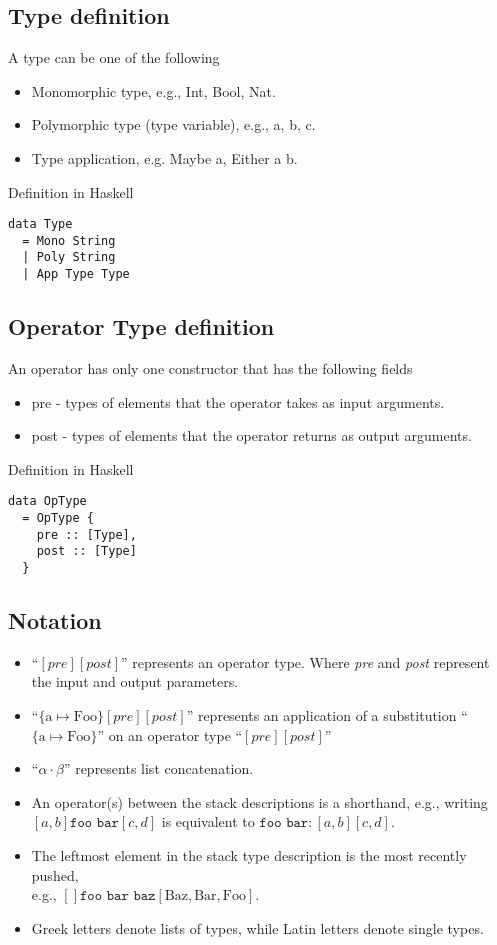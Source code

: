 \documentclass{article}
\newcommand{\op}[3]{[#1] \texttt{#2} [#3]}
\begin{document}
\subsection*{Type definition}
A type can be one of the following
\begin{itemize}
  \item Monomorphic type, e.g., Int, Bool, Nat.
  \item Polymorphic type (type variable), e.g., a, b, c.
  \item Type application, e.g. Maybe a, Either a b.
\end{itemize}
Definition in Haskell
\begin{verbatim}
data Type
  = Mono String
  | Poly String
  | App Type Type
\end{verbatim}

\subsection*{Operator Type definition}
An operator has only one constructor that has the following fields
\begin{itemize}
  \item pre - types of elements that the operator takes as input arguments.
  \item post - types of elements that the operator returns as output arguments.
\end{itemize}
Definition in Haskell
\begin{verbatim}
data OpType
  = OpType {
    pre :: [Type],
    post :: [Type]
  }
\end{verbatim}

\subsection*{Notation}
\begin{itemize}
  \item ``$\op{\textit{pre}}{}{\textit{post}}$'' represents an
    operator type. Where \textit{pre} and \textit{post} represent the
    input and output parameters.
  \item ``$\{ \text{a} \mapsto \text{Foo} \}
    \op{\textit{pre}}{}{\textit{post}}$'' represents an application
    of a substitution ``$\{ \text{a} \mapsto \text{Foo} \}$'' on an
    operator type ``$\op{\textit{pre}}{}{\textit{post}}$''
  \item ``$\alpha \cdot \beta$'' represents list concatenation.
  \item An operator(s) between the stack descriptions is a shorthand,
    e.g., writing $\op{a, b}{foo bar}{c, d}$ is equivalent to
    $\texttt{foo bar} : \op{a, b}{}{c, d}$.
  \item The leftmost element in the stack type description is the
    most recently pushed,\\
    e.g., $\op{}{foo bar baz}{\text{Baz}, \text{Bar}, \text{Foo}}$.
  \item Greek letters denote lists of types, while Latin letters
    denote single types.
\end{itemize}
\end{document}
